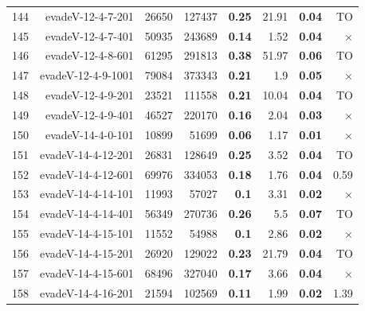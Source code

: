 \begin{longtable}{lrr@{\hskip 12pt}r@{\hskip 12pt}r@{\hskip 12pt}r@{\hskip 12pt}r@{\hskip 12pt}r}
144 & \multirow{1}{*}{evadeV-12-4-7-201} & \multirow{1}{*}{26650} & \multirow{1}{*}{127437} & \textbf{0.25} & 21.91 & \textbf{0.04} & TO \\
145 & \multirow{1}{*}{evadeV-12-4-7-401} & \multirow{1}{*}{50935} & \multirow{1}{*}{243689} & \textbf{0.14} & 1.52 & \textbf{0.04} & $\times$ \\
146 & \multirow{1}{*}{evadeV-12-4-8-601} & \multirow{1}{*}{61295} & \multirow{1}{*}{291813} & \textbf{0.38} & 51.97 & \textbf{0.06} & TO \\
147 & \multirow{1}{*}{evadeV-12-4-9-1001} & \multirow{1}{*}{79084} & \multirow{1}{*}{373343} & \textbf{0.21} & 1.9 & \textbf{0.05} & $\times$ \\
148 & \multirow{1}{*}{evadeV-12-4-9-201} & \multirow{1}{*}{23521} & \multirow{1}{*}{111558} & \textbf{0.21} & 10.04 & \textbf{0.04} & TO \\
149 & \multirow{1}{*}{evadeV-12-4-9-401} & \multirow{1}{*}{46527} & \multirow{1}{*}{220170} & \textbf{0.16} & 2.04 & \textbf{0.03} & $\times$ \\
150 & \multirow{1}{*}{evadeV-14-4-0-101} & \multirow{1}{*}{10899} & \multirow{1}{*}{51699} & \textbf{0.06} & 1.17 & \textbf{0.01} & $\times$ \\
151 & \multirow{1}{*}{evadeV-14-4-12-201} & \multirow{1}{*}{26831} & \multirow{1}{*}{128649} & \textbf{0.25} & 3.52 & \textbf{0.04} & TO \\
152 & \multirow{1}{*}{evadeV-14-4-12-601} & \multirow{1}{*}{69976} & \multirow{1}{*}{334053} & \textbf{0.18} & 1.76 & \textbf{0.04} & 0.59 \\
153 & \multirow{1}{*}{evadeV-14-4-14-101} & \multirow{1}{*}{11993} & \multirow{1}{*}{57027} & \textbf{0.1} & 3.31 & \textbf{0.02} & $\times$ \\
154 & \multirow{1}{*}{evadeV-14-4-14-401} & \multirow{1}{*}{56349} & \multirow{1}{*}{270736} & \textbf{0.26} & 5.5 & \textbf{0.07} & TO \\
155 & \multirow{1}{*}{evadeV-14-4-15-101} & \multirow{1}{*}{11552} & \multirow{1}{*}{54988} & \textbf{0.1} & 2.86 & \textbf{0.02} & $\times$ \\
156 & \multirow{1}{*}{evadeV-14-4-15-201} & \multirow{1}{*}{26920} & \multirow{1}{*}{129022} & \textbf{0.23} & 21.79 & \textbf{0.04} & TO \\
157 & \multirow{1}{*}{evadeV-14-4-15-601} & \multirow{1}{*}{68496} & \multirow{1}{*}{327040} & \textbf{0.17} & 3.66 & \textbf{0.04} & $\times$ \\
158 & \multirow{1}{*}{evadeV-14-4-16-201} & \multirow{1}{*}{21594} & \multirow{1}{*}{102569} & \textbf{0.11} & 1.99 & \textbf{0.02} & 1.39 \\

\end{longtable}
